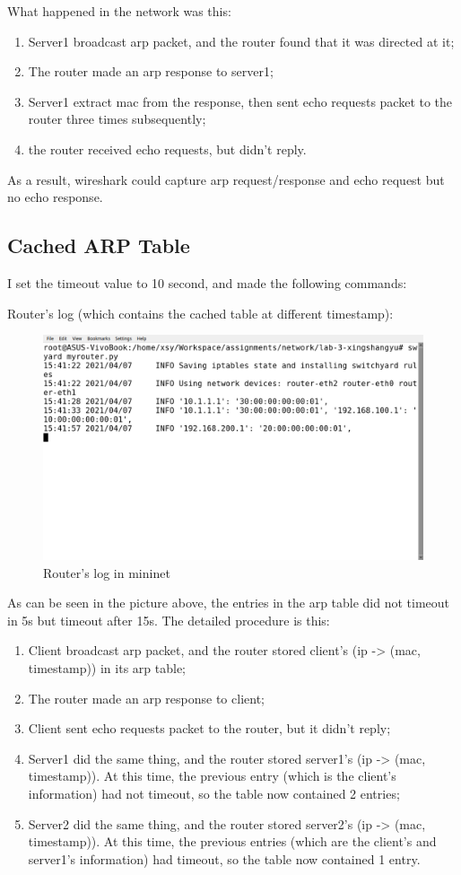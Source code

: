 \documentclass[12pt,a4paper,UTF8]{article}
\begin{document}
\newpage
What happened in the network was this:
\begin{enumerate}
	\item Server1 broadcast arp packet, and the router found that it was directed at it;
	\item The router made an arp response to server1;
	\item Server1 extract mac from the response, then sent echo requests packet to the router three times subsequently;
	\item the router received echo requests, but didn't reply.
\end{enumerate}
As a result, wireshark could capture arp request/response and echo request but no echo response.

\subsection{Cached ARP Table}
I set the timeout value to 10 second, and made the following commands:

Router's log (which contains the cached table at different timestamp):
\begin{figure}[htbp]
	\centering
	\includegraphics[width=\textwidth]{3}
	\caption{Router's log in mininet}
\end{figure}
\newpage
As can be seen in the picture above, the entries in the arp table did not timeout in 5s but timeout after 15s. The detailed procedure is this:
\begin{enumerate}
	\item Client broadcast arp packet, and the router stored client's (ip -> (mac, timestamp)) in its arp table;
	\item The router made an arp response to client;
	\item Client sent echo requests packet to the router, but it didn't reply;
	\item Server1 did the same thing, and the router stored server1's (ip -> (mac, timestamp)). At this time, the previous entry (which is the client's information) had not timeout, so the table now contained 2 entries;
	\item Server2 did the same thing, and the router stored server2's (ip -> (mac, timestamp)). At this time, the previous entries (which are the client's and server1's information) had timeout, so the table now contained 1 entry.
\end{enumerate}
\end{document}
